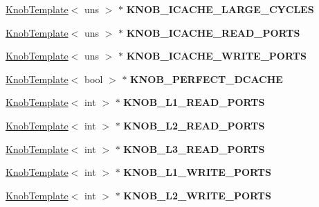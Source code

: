 \begin{DoxyCompactItemize}
\item 
\hypertarget{classall__knobs__c_aeee0ff6b42900ff51a2c47d456df48c4}{
\hyperlink{classKnobTemplate}{KnobTemplate}$<$ uns $>$ $\ast$ {\bfseries KNOB\_\-ICACHE\_\-LARGE\_\-CYCLES}}
\label{classall__knobs__c_aeee0ff6b42900ff51a2c47d456df48c4}

\item 
\hypertarget{classall__knobs__c_a74218ec8263f8ce9a0f864ea712fb1f4}{
\hyperlink{classKnobTemplate}{KnobTemplate}$<$ uns $>$ $\ast$ {\bfseries KNOB\_\-ICACHE\_\-READ\_\-PORTS}}
\label{classall__knobs__c_a74218ec8263f8ce9a0f864ea712fb1f4}

\item 
\hypertarget{classall__knobs__c_af4930b6058f6200b32c083e16041ee57}{
\hyperlink{classKnobTemplate}{KnobTemplate}$<$ uns $>$ $\ast$ {\bfseries KNOB\_\-ICACHE\_\-WRITE\_\-PORTS}}
\label{classall__knobs__c_af4930b6058f6200b32c083e16041ee57}

\item 
\hypertarget{classall__knobs__c_aba72fb5620ef9ed5ddd4ecf35c006562}{
\hyperlink{classKnobTemplate}{KnobTemplate}$<$ bool $>$ $\ast$ {\bfseries KNOB\_\-PERFECT\_\-DCACHE}}
\label{classall__knobs__c_aba72fb5620ef9ed5ddd4ecf35c006562}

\item 
\hypertarget{classall__knobs__c_abce9f3a03657968df7a3ed3b5fe384f4}{
\hyperlink{classKnobTemplate}{KnobTemplate}$<$ int $>$ $\ast$ {\bfseries KNOB\_\-L1\_\-READ\_\-PORTS}}
\label{classall__knobs__c_abce9f3a03657968df7a3ed3b5fe384f4}

\item 
\hypertarget{classall__knobs__c_aed8c7303d2992ec036b8d16b4fd45d7b}{
\hyperlink{classKnobTemplate}{KnobTemplate}$<$ int $>$ $\ast$ {\bfseries KNOB\_\-L2\_\-READ\_\-PORTS}}
\label{classall__knobs__c_aed8c7303d2992ec036b8d16b4fd45d7b}

\item 
\hypertarget{classall__knobs__c_a044107b120c2fe8c7c4b476705544aaf}{
\hyperlink{classKnobTemplate}{KnobTemplate}$<$ int $>$ $\ast$ {\bfseries KNOB\_\-L3\_\-READ\_\-PORTS}}
\label{classall__knobs__c_a044107b120c2fe8c7c4b476705544aaf}

\item 
\hypertarget{classall__knobs__c_a37df564fcfc140f80c56ba561bfd7023}{
\hyperlink{classKnobTemplate}{KnobTemplate}$<$ int $>$ $\ast$ {\bfseries KNOB\_\-L1\_\-WRITE\_\-PORTS}}
\label{classall__knobs__c_a37df564fcfc140f80c56ba561bfd7023}

\item 
\hypertarget{classall__knobs__c_aa7730ebfb8220e9cdb66bea41b704fd3}{
\hyperlink{classKnobTemplate}{KnobTemplate}$<$ int $>$ $\ast$ {\bfseries KNOB\_\-L2\_\-WRITE\_\-PORTS}}
\label{classall__knobs__c_aa7730ebfb8220e9cdb66bea41b704fd3}


\end{DoxyCompactItemize}
